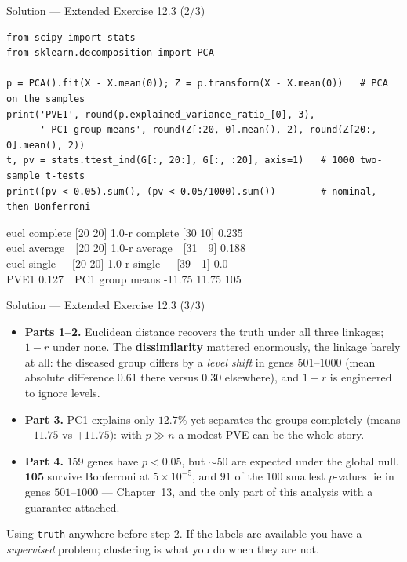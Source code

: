 \documentclass[aspectratio=169,11pt]{beamer}
\begin{document}
\begin{frame}[fragile]{Solution --- Extended Exercise 12.3 (2/3)}
  \footnotesize
\begin{solutionbox}
\begin{lstlisting}[basicstyle=\ttfamily\scriptsize]
from scipy import stats
from sklearn.decomposition import PCA

p = PCA().fit(X - X.mean(0)); Z = p.transform(X - X.mean(0))   # PCA on the samples
print('PVE1', round(p.explained_variance_ratio_[0], 3),
      ' PC1 group means', round(Z[:20, 0].mean(), 2), round(Z[20:, 0].mean(), 2))
t, pv = stats.ttest_ind(G[:, 20:], G[:, :20], axis=1)   # 1000 two-sample t-tests
print((pv < 0.05).sum(), (pv < 0.05/1000).sum())        # nominal, then Bonferroni
\end{lstlisting}
  \begin{center}\ttfamily\scriptsize
  eucl complete [20 20] 1.0-r complete [30 10] 0.235\\
  eucl average\ \ [20 20] 1.0-r average\ \ [31\ \ 9] 0.188\\
  eucl single\ \ \ [20 20] 1.0-r single\ \ \ [39\ \ 1] 0.0\\[2pt]
  PVE1 0.127\ \ PC1 group means -11.75 11.75 105
  \end{center}
\end{solutionbox}
\end{frame}

\begin{frame}{Solution --- Extended Exercise 12.3 (3/3)}
  \footnotesize
\begin{solutionbox}
  \begin{itemize}
    \item \textbf{Parts 1--2.} Euclidean distance recovers the truth under all three
          linkages; $1-r$ under none. The \textbf{dissimilarity} mattered enormously, the
          linkage barely at all: the diseased group differs by a \emph{level shift} in genes
          $501$--$1000$ (mean absolute difference $0.61$ there versus $0.30$ elsewhere), and
          $1-r$ is engineered to ignore levels.
    \item \textbf{Part 3.} PC1 explains only $12.7\%$ yet separates the groups completely
          (means $-11.75$ vs $+11.75$): with $p\gg n$ a modest PVE can be the whole story.
    \item \textbf{Part 4.} $159$ genes have $p<0.05$, but $\sim 50$ are expected under the
          global null. $\mathbf{105}$ survive Bonferroni at $5\times10^{-5}$, and $91$ of
          the $100$ smallest $p$-values lie in genes $501$--$1000$ --- Chapter~13, and the
          only part of this analysis with a guarantee attached.
  \end{itemize}
\end{solutionbox}
\begin{mistake}
  Using \texttt{truth} anywhere before step 2. If the labels are available you have a
  \emph{supervised} problem; clustering is what you do when they are not.
\end{mistake}
\end{frame}
\end{document}
